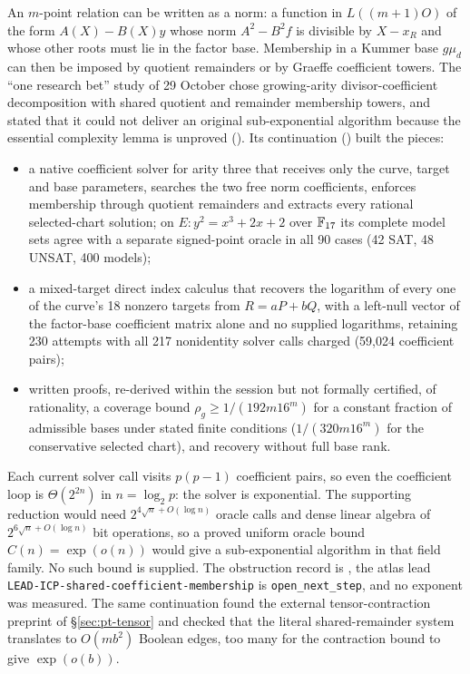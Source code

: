 An $m$-point relation can be written as a norm: a function in
$L((m+1)O)$ of the form $A(X)-B(X)y$ whose norm $A^2-B^2f$ is divisible by
$X-x_R$ and whose other roots must lie in the factor base. Membership in a
Kummer base $g\mu_d$ can then be imposed by quotient remainders or by
Graeffe coefficient towers. The ``one research bet'' study of 29 October
chose growing-arity divisor-coefficient decomposition with shared quotient
and remainder membership towers, and stated that it could not deliver an
original sub-exponential algorithm because the essential complexity lemma
is unproved (). Its continuation
() built the pieces:
\begin{itemize}
\item a native coefficient solver for arity three that receives only the
  curve, target and base parameters, searches the two free norm
  coefficients, enforces membership through quotient remainders and extracts
  every rational selected-chart solution; on $E:y^2=x^3+2x+2$ over
  $\mathbb{F}_{17}$ its complete model sets agree with a separate signed-point
  oracle in all 90 cases (42 SAT, 48 UNSAT, 400 models);
\item a mixed-target direct index calculus that recovers the logarithm of
  every one of the curve's 18 nonzero targets from $R=aP+bQ$, with a
  left-null vector of the factor-base coefficient matrix alone and no
  supplied logarithms, retaining 230 attempts with all 217 nonidentity
  solver calls charged (59{,}024 coefficient pairs);
\item written proofs, re-derived within the session but not formally
  certified, of rationality, a coverage bound $\rho_g\ge1/(192m16^m)$ for a
  constant fraction of admissible bases under stated finite conditions
  ($1/(320m16^m)$ for the conservative selected chart), and recovery
  without full base rank.
\end{itemize}
Each current solver call visits $p(p-1)$ coefficient pairs, so even the
coefficient loop is $\Theta(2^{2n})$ in $n=\log_2p$: the solver is
exponential. The supporting reduction would need $2^{4\sqrt n+O(\log n)}$
oracle calls and dense linear algebra of $2^{6\sqrt n+O(\log n)}$ bit
operations, so a proved uniform oracle bound $C(n)=\exp(o(n))$ would give a
sub-exponential algorithm in that field family. No such bound is supplied.
The obstruction record is ,
the atlas lead \texttt{LEAD-ICP-shared-coefficient-membership} is
\texttt{open\_next\_step}, and no exponent was measured. The same
continuation found the external tensor-contraction preprint of
\S\ref{sec:pt-tensor} and checked that the literal shared-remainder system
translates to $O(mb^2)$ Boolean edges, too many for the contraction bound
to give $\exp(o(b))$.

